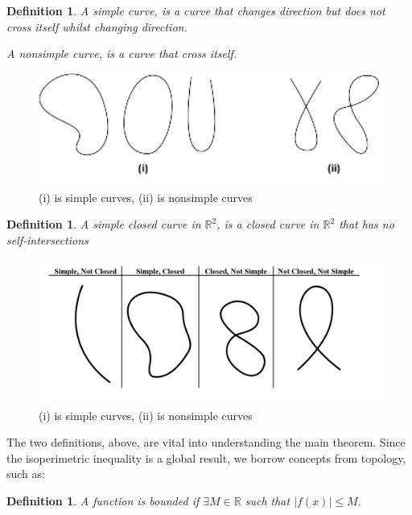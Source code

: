 \documentclass[a4paper]{book}
\newtheorem{definition}[theorem]{Definition}%
\numberwithin{theorem}{section}%
\begin{document}
\begin{definition}
    A simple curve, is a curve that changes direction but does not cross itself whilst changing direction. 

    A nonsimple curve, is a curve that cross itself.
\end{definition}
\begin{figure}[hbt!]
    \begin{center}   
        \includegraphics[width=130mm]{SimpleCurves}
        \caption{(i) is simple curves, (ii) is nonsimple curves}
    \end{center}
\end{figure}\leavevmode

\begin{definition}
    A simple closed curve in $\mathbb{R}^2$, is a closed curve in $\mathbb{R}^2$ that has no self-intersections
\end{definition}
\begin{figure}[hbt!]
    \begin{center}   
        \includegraphics[width=130mm]{SimpleClosedCurveExamples}
        \caption{(i) is simple curves, (ii) is nonsimple curves}
    \end{center}
\end{figure}\leavevmode

The two definitions, above, are vital into understanding the main theorem. Since the isoperimetric inequality is a global result, we borrow concepts from topology, such as:

\begin{definition}
    A function is bounded if $\exists M \in \mathbb{R}$ such that $\left| f(x) \right| \leq M$.
\end{definition}
\end{document}
